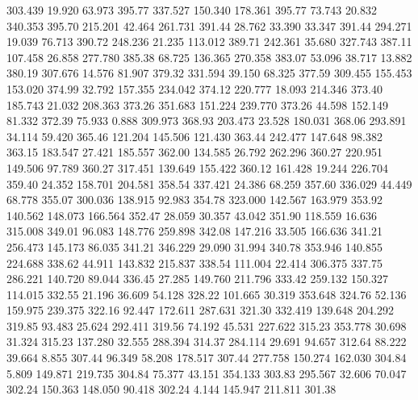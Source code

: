  303.439   19.920   63.973       395.77
 337.527  150.340  178.361       395.77
  73.743   20.832  340.353       395.70
 215.201   42.464  261.731       391.44
  28.762   33.390   33.347       391.44
 294.271   19.039   76.713       390.72
 248.236   21.235  113.012       389.71
 242.361   35.680  327.743       387.11
 107.458   26.858  277.780       385.38
  68.725  136.365  270.358       383.07
  53.096   38.717   13.882       380.19
 307.676   14.576   81.907       379.32
 331.594   39.150   68.325       377.59
 309.455  155.453  153.020       374.99
  32.792  157.355  234.042       374.12
 220.777   18.093  214.346       373.40
 185.743   21.032  208.363       373.26
 351.683  151.224  239.770       373.26
  44.598  152.149   81.332       372.39
  75.933    0.888  309.973       368.93
 203.473   23.528  180.031       368.06
 293.891   34.114   59.420       365.46
 121.204  145.506  121.430       363.44
 242.477  147.648   98.382       363.15
 183.547   27.421  185.557       362.00
 134.585   26.792  262.296       360.27
 220.951  149.506   97.789       360.27
 317.451  139.649  155.422       360.12
 161.428   19.244  226.704       359.40
  24.352  158.701  204.581       358.54
 337.421   24.386   68.259       357.60
 336.029   44.449   68.778       355.07
 300.036  138.915   92.983       354.78
 323.000  142.567  163.979       353.92
 140.562  148.073  166.564       352.47
  28.059   30.357   43.042       351.90
 118.559   16.636  315.008       349.01
  96.083  148.776  259.898       342.08
 147.216   33.505  166.636       341.21
 256.473  145.173   86.035       341.21
 346.229   29.090   31.994       340.78
 353.946  140.855  224.688       338.62
  44.911  143.832  215.837       338.54
 111.004   22.414  306.375       337.75
 286.221  140.720   89.044       336.45
  27.285  149.760  211.796       333.42
 259.132  150.327  114.015       332.55
  21.196   36.609   54.128       328.22
 101.665   30.319  353.648       324.76
  52.136  159.975  239.375       322.16
  92.447  172.611  287.631       321.30
 332.419  139.648  204.292       319.85
  93.483   25.624  292.411       319.56
  74.192   45.531  227.622       315.23
 353.778   30.698   31.324       315.23
 137.280   32.555  288.394       314.37
 284.114   29.691   94.657       312.64
  88.222   39.664    8.855       307.44
  96.349   58.208  178.517       307.44
 277.758  150.274  162.030       304.84
   5.809  149.871  219.735       304.84
  75.377   43.151  354.133       303.83
 295.567   32.606   70.047       302.24
 150.363  148.050   90.418       302.24
   4.144  145.947  211.811       301.38
